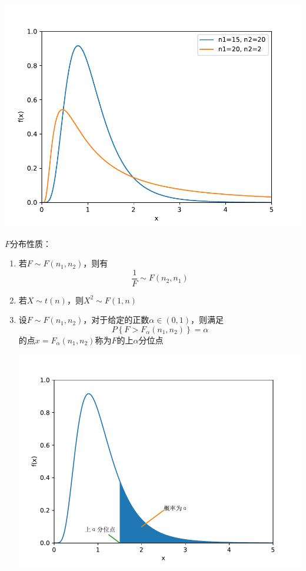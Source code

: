 \documentclass[12pt,a4paper,UTF8]{book}
\begin{document}
\begin{enumerate}
\begin{center}\includegraphics[scale=0.5]{./figure/F.pdf}\end{center}
$F$分布性质：
\begin{enumerate}
\item 若$F\sim F\left(n_1,n_2\right)$，则有
\[\frac{1}{F}\sim F\left(n_2,n_1\right)\]
\item 若$X\sim t\left(n\right)$，则$X^2\sim F\left(1,n\right)$
\item 设$F\sim F\left(n_1,n_2\right)$，对于给定的正数$\alpha\in\left(0,1\right)$，则满足
\[P\left\{F>F_{\alpha}\left(n_1,n_2\right)\right\}=\alpha\]
的点$x=F_{\alpha}\left(n_1,n_2\right)$称为$F$的上$\alpha$分位点
\begin{center}\includegraphics[scale=0.5]{./figure/F_alpha.pdf}\end{center}
\end{enumerate}
\end{enumerate}
\end{document}
